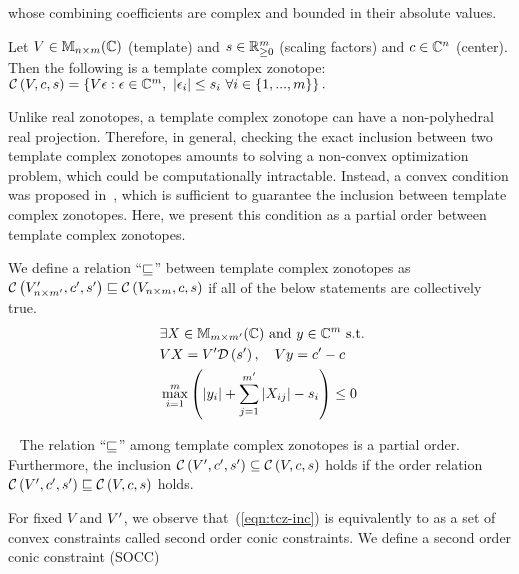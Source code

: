 whose combining coefficients are complex and bounded in their absolute
values.
%
\begin{definition}
Let $V\in\mat{n}{m}{\mb{C}}$ (template) and $s\in\mb{R}^m_{\geq 0}$ (scaling factors) and
$c\in\mb{C}^n$ (center).  Then the following is a template complex zonotope:
$\cz{V}{c}{s} =
\lt\{V\epsilon:\epsilon\in\mb{C}^m,~\lt|\epsilon_i\rt|\leq s_i~\forall
i\in\tup{m}\rt\}.$
\end{definition}
%
Unlike real zonotopes, a template complex zonotope can have a
non-polyhedral real projection.  Therefore, in general, checking the
exact inclusion between two template complex zonotopes amounts to
solving a non-convex optimization problem, which could be computationally intractable.
Instead, a convex condition was proposed in~\cite{tcz2017}, which is
sufficient to guarantee the inclusion between template complex
zonotopes.  Here, we present this condition as a partial order between
template complex zonotopes.
%
\begin{definition}
We define a relation ``$\order$'' between template complex zonotopes
as\\ $\cz{V^\pr_{n\times m^\pr}}{c^\pr}{s^\pr}\order \cz{V_{n\times
    m}}{c}{s}$ if all of the below statements are collectively true.
\begin{align}~\label{eqn:tcz-inc}
\begin{split}
& \exists X\in\mat{m}{m^\pr}{\mb{C}}~\text{and}~y\in\mb{C}^{m}~\text{s.t.}\\
& \transfer{V}{V^\pr}{s^\pr}{X},~~~\centertransfer{V}{c}{c^\pr}{y}\\
& \scalebound{X}{y}{s}{m}{m^\pr}\leq 0\\
\end{split}
\end{align}
\end{definition}
%
\begin{lemma}~\label{lem:zon-zon} The relation ``$\order$'' among
template complex zonotopes is a partial order.  Furthermore, the
inclusion $\cz{V^\pr}{c^\pr}{s^\pr}\subseteq \cz{V}{c}{s}$ holds if
the order relation $\cz{{V^\pr}}{c^\pr}{s^\pr}\order \cz{V}{c}{s}$ holds.
\end{lemma}
%
For fixed $V$ and $V^\pr$, we observe that~(\ref{eqn:tcz-inc}) is
equivalently to as a set of convex constraints called second order
conic constraints.  We define a second order conic constraint (SOCC)

